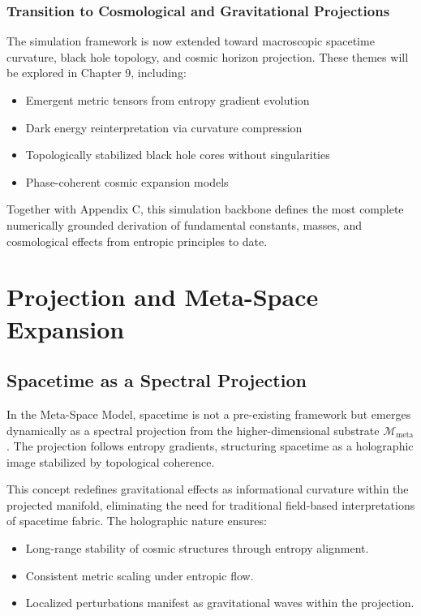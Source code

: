 \documentclass[10.5pt,a4paper]{article}
\begin{document}
\subsubsection{Transition to Cosmological and Gravitational Projections}

The simulation framework is now extended toward macroscopic spacetime curvature, black hole topology, and cosmic horizon projection. These themes will be explored in Chapter 9, including:

\begin{itemize}
  \item Emergent metric tensors from entropy gradient evolution
  \item Dark energy reinterpretation via curvature compression
  \item Topologically stabilized black hole cores without singularities
  \item Phase-coherent cosmic expansion models
\end{itemize}

Together with Appendix C, this simulation backbone defines the most complete numerically grounded derivation of fundamental constants, masses, and cosmological effects from entropic principles to date.

\clearpage

\section{Projection and Meta-Space Expansion}

\subsection{Spacetime as a Spectral Projection}

In the Meta-Space Model, spacetime is not a pre-existing framework but emerges dynamically as a spectral projection 
from the higher-dimensional substrate \( \mathcal{M}_{\text{meta}} \). The projection follows entropy gradients, 
structuring spacetime as a holographic image stabilized by topological coherence.

This concept redefines gravitational effects as informational curvature within the projected manifold, eliminating 
the need for traditional field-based interpretations of spacetime fabric. The holographic nature ensures:
\begin{itemize}
    \item Long-range stability of cosmic structures through entropy alignment.
    \item Consistent metric scaling under entropic flow.
    \item Localized perturbations manifest as gravitational waves within the projection.
\end{itemize}
\end{document}
